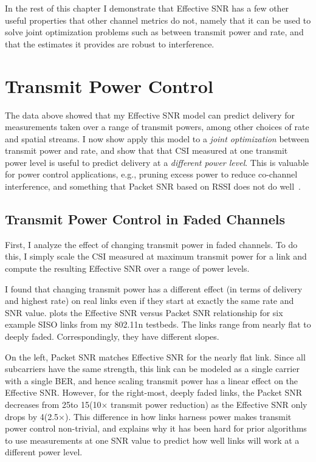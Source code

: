 In the rest of this chapter I demonstrate that Effective SNR has a few other useful properties that other channel metrics do not, namely that it can be used to solve joint optimization problems such as between transmit power and rate, and that the estimates it provides are robust to interference.

\section{Transmit Power Control}
\label{sec:tx_power_trim}
The data above showed that my Effective SNR model can predict delivery for measurements taken over a range of transmit powers, among other choices of rate and spatial streams. I now show apply this model to a \emph{joint optimization} between transmit power and rate, and show that that CSI measured at one transmit power level is useful to predict delivery at a \emph{different power level}. This is valuable for power control applications, e.g., pruning excess power to reduce co-channel interference, and something that Packet SNR based on RSSI does not do well~\cite{Monks_PowerMAC,Ramachandran_Symphony,Son_PowerStudy}. 

\subsection{Transmit Power Control in Faded Channels}
First, I analyze the effect of changing transmit power in faded channels. To do this, I simply scale the CSI measured at maximum transmit power for a link and compute the resulting Effective SNR over a range of power levels.

I found that changing transmit power has a different effect (in terms of delivery and highest rate) on real links even if they start at exactly the same rate and SNR value.  plots the Effective SNR versus Packet SNR relationship for six example SISO links from my 802.11n testbeds. The links range from nearly flat to deeply faded. Correspondingly, they have different slopes.

On the left, Packet SNR matches Effective SNR for the nearly flat link. Since all subcarriers have the same strength, this link can be modeled as a single carrier with a single BER, and hence scaling transmit power has a linear effect on the Effective SNR. However, for the right-most, deeply faded links, the Packet SNR decreases from 25\dB to 15\dB (10$\times$ transmit power reduction) as the Effective SNR only drops by 4\dB (2.5$\times$). This difference in how links harness power makes transmit power control non-trivial, and explains why it has been hard for prior algorithms to use measurements at one SNR value to predict how well links will work at a different power level.

